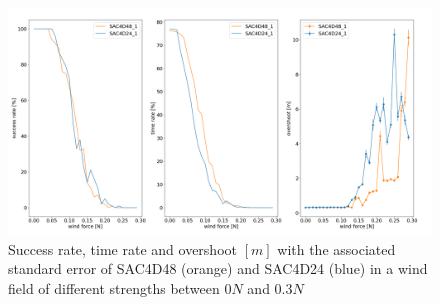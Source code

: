 \begin{figure}
	\centering
	\includegraphics[width=\linewidth]{figures/windsuc.png}
	\caption{Success rate, time rate and overshoot $[m]$ with the associated standard error
	of SAC4D48 (orange) and SAC4D24 (blue) in a wind field of different strengths between $0N$ and $0.3N$}
	\label{fig:succ}
\end{figure}
